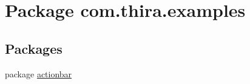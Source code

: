 \hypertarget{namespacecom_1_1thira_1_1examples}{\section{Package com.\-thira.\-examples}
\label{namespacecom_1_1thira_1_1examples}
}
\subsection*{Packages}
\begin{DoxyCompactItemize}
\item 
package \hyperlink{namespacecom_1_1thira_1_1examples_1_1actionbar}{actionbar}
\end{DoxyCompactItemize}
